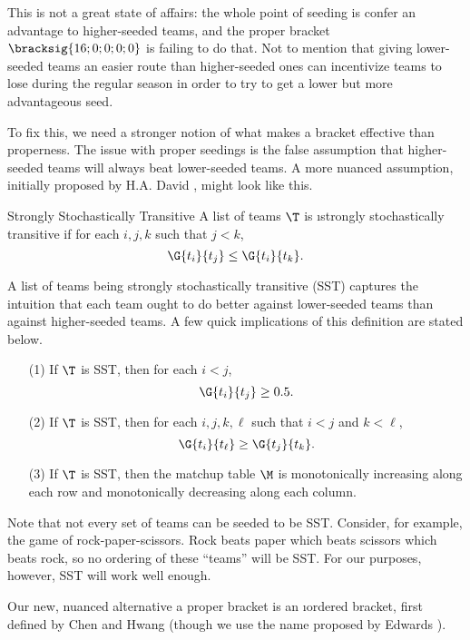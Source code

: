 {This is not a great state of affairs: the whole point of seeding is confer an advantage to higher-seeded teams, and the proper bracket $\bracksig{16; 0; 0; 0; 0}$ is failing to do that. Not to mention that giving lower-seeded teams an easier route than higher-seeded ones can incentivize teams to lose during the regular season in order to try to get a lower but more advantageous seed.

To fix this, we need a stronger notion of what makes a bracket effective than properness. The issue with proper seedings is the false assumption that higher-seeded teams will always beat lower-seeded teams. A more nuanced assumption, initially proposed by H.A. David \cite{stochastic}, might look like this.

\begin{definition}{Strongly Stochastically Transitive}{}
    A list of teams $\T$ is \i{strongly stochastically transitive} if for each $i, j, k$ such that $j < k$, $$\G{t_i}{t_j} \leq \G{t_i}{t_k}.$$
\end{definition}

A list of teams being strongly stochastically transitive (SST) captures the intuition that each team ought to do better against lower-seeded teams than against higher-seeded teams. A few quick implications of this definition are stated below.

\begin{corollary}{}{}
    \begin{enumerate}
        \item[(1)] If $\T$ is SST, then for each $i < j$, $$\G{t_i}{t_j} \geq 0.5.$$
        \item[(2)] If $\T$ is SST, then for each $i, j, k, \ell$ such that $i < j$ and $k < \ell$, $$\G{t_i}{t_\ell} \geq \G{t_j}{t_k}.$$
        \item[(3)] If $\T$ is SST, then the matchup table $\M$ is monotonically increasing along each row and monotonically decreasing along each column.
    \end{enumerate}
    \end{corollary}

Note that not every set of teams can be seeded to be SST. Consider, for example, the game of rock-paper-scissors. Rock beats paper which beats scissors which beats rock, so no ordering of these ``teams'' will be SST. For our purposes, however, SST will work well enough.

Our new, nuanced alternative a proper bracket is an \i{ordered bracket}, first defined by Chen and Hwang \cite{define_ordered}  (though we use the name proposed by Edwards \cite{montana}).

}
